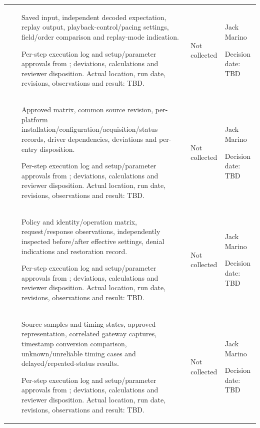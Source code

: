 \begin{landscape}
\begin{tabularx}{\linewidth}{L{2.0cm}L{3.3cm}Y L{2.3cm}L{2.6cm}}
 & \par {} & Saved input, independent decoded expectation, replay output, playback-control/pacing settings, field/order comparison and replay-mode indication.\par Per-step execution log and setup/parameter approvals from ; deviations, calculations and reviewer disposition. Actual location, run date, revisions, observations and result: TBD. & Not collected & Jack Marino\par Decision date: TBD\\
 & \par {} & Approved matrix, common source revision, per-platform installation/configuration/acquisition/status records, driver dependencies, deviations and per-entry disposition.\par Per-step execution log and setup/parameter approvals from ; deviations, calculations and reviewer disposition. Actual location, run date, revisions, observations and result: TBD. & Not collected & Jack Marino\par Decision date: TBD\\
 & \par {} & Policy and identity/operation matrix, request/response observations, independently inspected before/after effective settings, denial indications and restoration record.\par Per-step execution log and setup/parameter approvals from ; deviations, calculations and reviewer disposition. Actual location, run date, revisions, observations and result: TBD. & Not collected & Jack Marino\par Decision date: TBD\\
 & \par {} & Source samples and timing states, approved representation, correlated gateway captures, timestamp conversion comparison, unknown/unreliable timing cases and delayed/repeated-status results.\par Per-step execution log and setup/parameter approvals from ; deviations, calculations and reviewer disposition. Actual location, run date, revisions, observations and result: TBD. & Not collected & Jack Marino\par Decision date: TBD\\
\end{tabularx}
\normalsize
\end{landscape}
